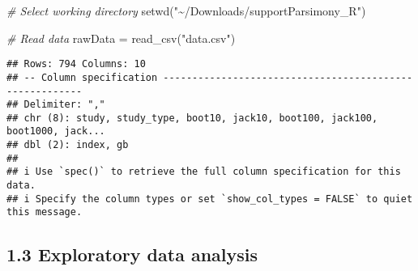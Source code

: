 \documentclass[
]{article}
\newenvironment{Shaded}{\begin{snugshade}}{\end{snugshade}}
\newcommand{\CommentTok}[1]{\textcolor[rgb]{0.56,0.35,0.01}{\textit{#1}}}
\newcommand{\FunctionTok}[1]{\textcolor[rgb]{0.00,0.00,0.00}{#1}}
\newcommand{\NormalTok}[1]{#1}
\newcommand{\OtherTok}[1]{\textcolor[rgb]{0.56,0.35,0.01}{#1}}
\newcommand{\SpecialCharTok}[1]{\textcolor[rgb]{0.00,0.00,0.00}{#1}}
\newcommand{\StringTok}[1]{\textcolor[rgb]{0.31,0.60,0.02}{#1}}
\begin{document}
\begin{Shaded}
\begin{Highlighting}[]
\CommentTok{\# Select working directory}
\FunctionTok{setwd}\NormalTok{(}\StringTok{"\textasciitilde{}/Downloads/supportParsimony\_R"}\NormalTok{)}

\CommentTok{\# Read data}
\NormalTok{rawData }\OtherTok{=} \FunctionTok{read\_csv}\NormalTok{(}\StringTok{"data.csv"}\NormalTok{)}
\end{Highlighting}
\end{Shaded}

\begin{verbatim}
## Rows: 794 Columns: 10
## -- Column specification --------------------------------------------------------
## Delimiter: ","
## chr (8): study, study_type, boot10, jack10, boot100, jack100, boot1000, jack...
## dbl (2): index, gb
## 
## i Use `spec()` to retrieve the full column specification for this data.
## i Specify the column types or set `show_col_types = FALSE` to quiet this message.
\end{verbatim}

\begin{Shaded}
\end{Shaded}

\hypertarget{exploratory-data-analysis}{%
\subsection{1.3 Exploratory data
analysis}\label{exploratory-data-analysis}}
\end{document}
